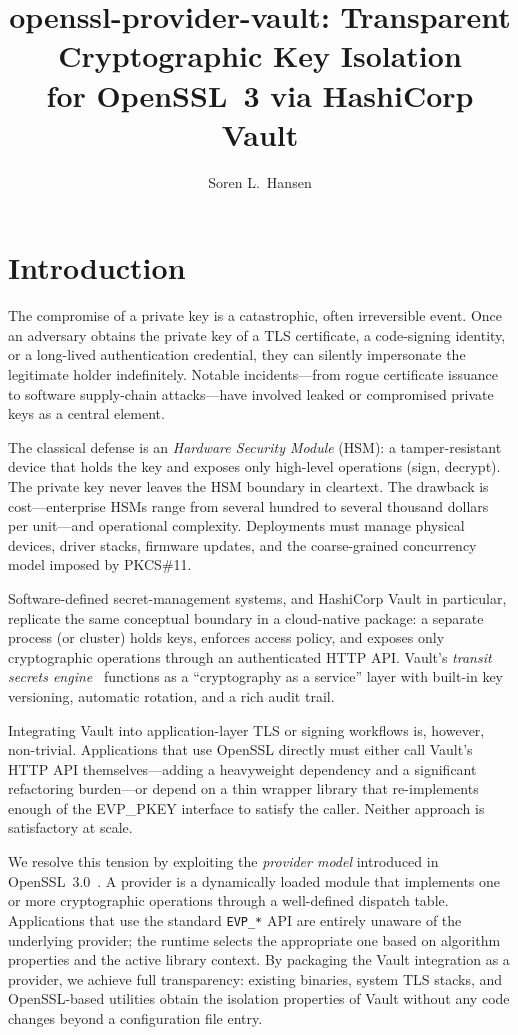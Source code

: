 \documentclass[sigconf,10pt]{acmart}
\title{openssl-provider-vault: Transparent Cryptographic Key Isolation\\
       for OpenSSL~3 via HashiCorp Vault}
\author{Soren L.~Hansen}
\affiliation{
  \institution{Independent Researcher}
  \city{}
  \country{}
}
\begin{document}
\maketitle

\section{Introduction}
\label{sec:intro}

The compromise of a private key is a catastrophic, often irreversible event.
Once an adversary obtains the private key of a TLS certificate, a code-signing
identity, or a long-lived authentication credential, they can silently
impersonate the legitimate holder indefinitely.  Notable incidents---from
rogue certificate issuance to software supply-chain attacks---have
involved leaked or compromised private keys as a central element.

The classical defense is an \emph{Hardware Security Module} (HSM): a
tamper-resistant device that holds the key and exposes only high-level
operations (sign, decrypt).  The private key never leaves the HSM boundary
in cleartext.  The drawback is cost---enterprise HSMs range from several
hundred to several thousand dollars per unit---and operational complexity.
Deployments must manage physical devices, driver stacks, firmware updates,
and the coarse-grained concurrency model imposed by PKCS\#11.

Software-defined secret-management systems, and HashiCorp Vault in particular,
replicate the same conceptual boundary in a cloud-native package: a separate
process (or cluster) holds keys, enforces access policy, and exposes only
cryptographic operations through an authenticated HTTP API.  Vault's
\emph{transit secrets engine}~\cite{vault-transit} functions as a
``cryptography as a service'' layer with built-in key versioning, automatic
rotation, and a rich audit trail.

Integrating Vault into application-layer TLS or signing workflows is,
however, non-trivial.  Applications that use OpenSSL directly must either
call Vault's HTTP API themselves---adding a heavyweight dependency and a
significant refactoring burden---or depend on a thin wrapper library that
re-implements enough of the EVP\_PKEY interface to satisfy the caller.
Neither approach is satisfactory at scale.

We resolve this tension by exploiting the \emph{provider model} introduced
in OpenSSL~3.0~\cite{openssl3-providers}.  A provider is a dynamically
loaded module that implements one or more cryptographic operations through a
well-defined dispatch table.  Applications that use the standard
\texttt{EVP\_*} API are entirely unaware of the underlying provider; the
runtime selects the appropriate one based on algorithm properties and the
active library context.  By packaging the Vault integration as a provider,
we achieve full transparency: existing binaries, system TLS stacks, and
OpenSSL-based utilities obtain the isolation properties of Vault without any
code changes beyond a configuration file entry.
\end{document}
